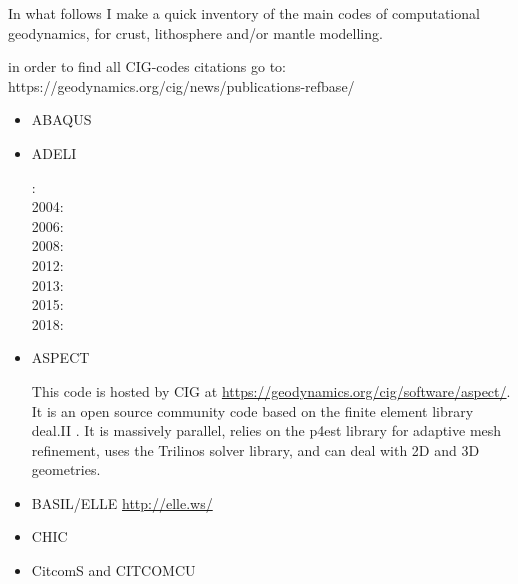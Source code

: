 
In what follows I make a quick inventory of the main codes of computational geodynamics, 
for crust, lithosphere and/or mantle modelling.

in order to find all CIG-codes citations go to: https://geodynamics.org/cig/news/publications-refbase/

\begin{itemize}

\item ABAQUS

\cite{gedh02}
\cite{fumr03}
\cite{camg07}
\cite{kuhe09}
\cite{camg10}
\cite{makh09}
\cite{nalr12}
\cite{pevp15}


\item ADELI

: \cite{hajc97}\\
2004: \cite{gocl04}\\
2006: \cite{vech06} \\
2008: \cite{boht08a}\cite{boht08b}\\
2012: \cite{gech12}\cite{gigh12}\\
2013: \cite{wahd13}\\
2015: \cite{ceag15}\\
2018: \cite{cegm18}\cite{gehn18}

\item ASPECT

This code is hosted by CIG at \url{https://geodynamics.org/cig/software/aspect/}. 
It is an open source community code based on the finite element library deal.II \cite{arbc19}. 
It is massively parallel, relies on the p4est library for adaptive mesh refinement,
uses the Trilinos solver library, and can deal with 2D and 3D geometries. 

\cite{bahk07}
\cite{krhb12}
\cite{aupm15}
\cite{tosn15}
\cite{dahe16}
\cite{gadb16}
\cite{zhon16}
\cite{hepb17}
\cite{daef17}
\cite{hedg17}
\cite{robh17}
\cite{robu17}
\cite{aumh17}
\cite{thie17}
\cite{brsg17}
\cite{onmz17}
\cite{tasm17}
\cite{zhli17}
\cite{daga18}
\cite{onzh18}
\cite{gltf18}
\cite{heps18}
\cite{galh18}
\cite{peka18}
\cite{puth18}
\cite{brst18b}
\cite{baba19}
\cite{stbl19}
\cite{cocf19}
\cite{liki19}

\item BASIL/ELLE \url{http://elle.ws/}
\cite{bokj08}
\cite{llor19}

\item CHIC 
\cite{norv15}

\item CitcomS and CITCOMCU


\end{itemize}
